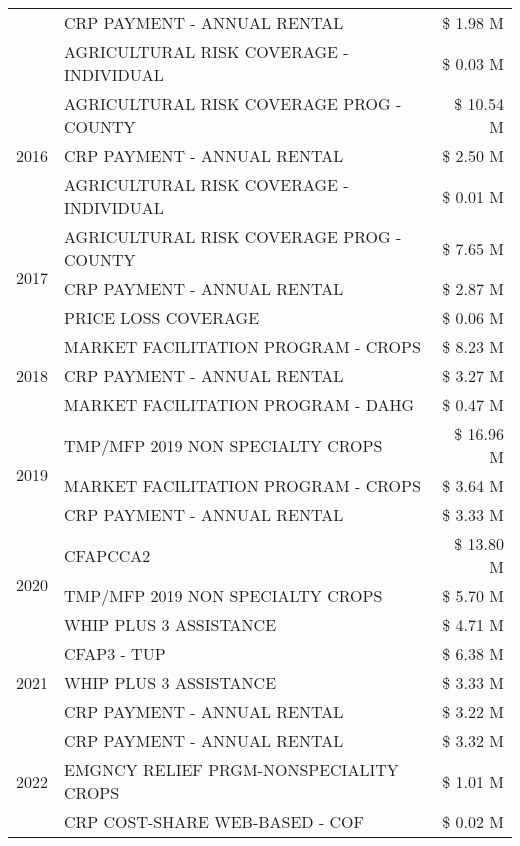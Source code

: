 \begin{tabular}{llr}
 & CRP PAYMENT - ANNUAL RENTAL & \$ 1.98 M \\
 & AGRICULTURAL RISK COVERAGE - INDIVIDUAL & \$ 0.03 M \\
\cline{1-3}
\multirow[t]{3}{*}{2016} & AGRICULTURAL RISK COVERAGE PROG - COUNTY & \$ 10.54 M \\
 & CRP PAYMENT - ANNUAL RENTAL & \$ 2.50 M \\
 & AGRICULTURAL RISK COVERAGE - INDIVIDUAL & \$ 0.01 M \\
\cline{1-3}
\multirow[t]{3}{*}{2017} & AGRICULTURAL RISK COVERAGE PROG - COUNTY & \$ 7.65 M \\
 & CRP PAYMENT - ANNUAL RENTAL & \$ 2.87 M \\
 & PRICE LOSS COVERAGE & \$ 0.06 M \\
\cline{1-3}
\multirow[t]{3}{*}{2018} & MARKET FACILITATION PROGRAM - CROPS & \$ 8.23 M \\
 & CRP PAYMENT - ANNUAL RENTAL & \$ 3.27 M \\
 & MARKET FACILITATION PROGRAM - DAHG & \$ 0.47 M \\
\cline{1-3}
\multirow[t]{3}{*}{2019} & TMP/MFP 2019 NON SPECIALTY CROPS & \$ 16.96 M \\
 & MARKET FACILITATION PROGRAM - CROPS & \$ 3.64 M \\
 & CRP PAYMENT - ANNUAL RENTAL & \$ 3.33 M \\
\cline{1-3}
\multirow[t]{3}{*}{2020} & CFAPCCA2 & \$ 13.80 M \\
 & TMP/MFP 2019 NON SPECIALTY CROPS & \$ 5.70 M \\
 & WHIP PLUS 3 ASSISTANCE & \$ 4.71 M \\
\cline{1-3}
\multirow[t]{3}{*}{2021} & CFAP3 - TUP & \$ 6.38 M \\
 & WHIP PLUS 3 ASSISTANCE & \$ 3.33 M \\
 & CRP PAYMENT - ANNUAL RENTAL & \$ 3.22 M \\
\cline{1-3}
\multirow[t]{3}{*}{2022} & CRP PAYMENT - ANNUAL RENTAL & \$ 3.32 M \\
 & EMGNCY RELIEF PRGM-NONSPECIALITY CROPS & \$ 1.01 M \\
 & CRP COST-SHARE WEB-BASED - COF & \$ 0.02 M \\
\cline{1-3}
\bottomrule
\end{tabular}
